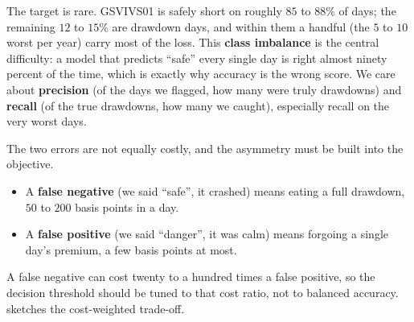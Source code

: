 The target is rare. GSVIVS01 is safely short on roughly $85$ to $88\%$ of days; the remaining $12$ to $15\%$ are drawdown days, and within them a handful (the $5$ to $10$ worst per year) carry most of the loss. This \textbf{class imbalance} is the central difficulty: a model that predicts ``safe'' every single day is right almost ninety percent of the time, which is exactly why accuracy is the wrong score. We care about \textbf{precision} (of the days we flagged, how many were truly drawdowns) and \textbf{recall} (of the true drawdowns, how many we caught), especially recall on the very worst days.

The two errors are not equally costly, and the asymmetry must be built into the objective.
\begin{itemize}
  \item A \textbf{false negative} (we said ``safe'', it crashed) means eating a full drawdown, $50$ to $200$ basis points in a day.
  \item A \textbf{false positive} (we said ``danger'', it was calm) means forgoing a single day's premium, a few basis points at most.
\end{itemize}
A false negative can cost twenty to a hundred times a false positive, so the decision threshold should be tuned to that cost ratio, not to balanced accuracy.  sketches the cost-weighted trade-off.

